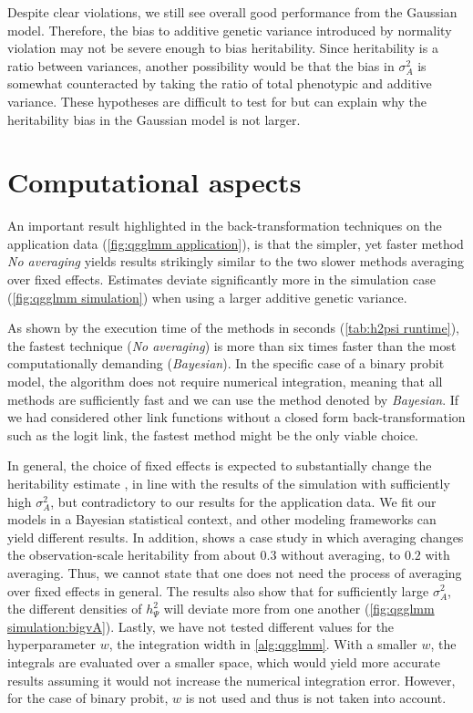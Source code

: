 Despite clear violations, we still see overall good performance from the Gaussian model. Therefore, the bias to additive genetic variance introduced by normality violation may not be severe enough to bias heritability. Since heritability is a ratio between variances, another possibility would be that the bias in $\sigma^2_A$ is somewhat counteracted by taking the ratio of total phenotypic and additive variance. These hypotheses are difficult to test for but can explain why the heritability bias in the Gaussian model is not larger. 

\section{Computational aspects}

An important result highlighted in the back-transformation techniques on the application data (\autoref{fig:qgglmm application}), is that the simpler, yet faster method \textit{No averaging} yields results strikingly similar to the two slower methods averaging over fixed effects. Estimates deviate significantly more in the simulation case (\autoref{fig:qgglmm simulation}) when using a larger additive genetic variance.

As shown by the execution time of the methods in seconds (\autoref{tab:h2psi runtime}), the fastest technique (\textit{No averaging}) is more than six times faster than the most computationally demanding (\textit{Bayesian}). In the specific case of a binary probit model, the algorithm does not require numerical integration, meaning that all methods are sufficiently fast and we can use the method denoted by \textit{Bayesian}. If we had considered other link functions without a closed form back-transformation such as the logit link, the fastest method might be the only viable choice.

In general, the choice of fixed effects is expected to substantially change the heritability estimate \autocite{wilson2008}, in line with the results of the simulation with sufficiently high $\sigma^2_A$, but contradictory to our results for the application data. We fit our models in a Bayesian statistical context, and other modeling frameworks can yield different results. In addition, \textcite{qgglmmguide2020} shows a case study in which averaging changes the observation-scale heritability from about $0.3$ without averaging, to $0.2$ with averaging. Thus, we cannot state that one does not need the process of averaging over fixed effects in general. The results also show that for sufficiently large $\sigma^2_A$, the different densities of $h^2_\Psi$ will deviate more from one another (\autoref{fig:qgglmm simulation:bigvA}). Lastly, we have not tested different values for the hyperparameter $w$, the integration width in \autoref{alg:qgglmm}. With a smaller $w$, the integrals are evaluated over a smaller space, which would yield more accurate results assuming it would not increase the numerical integration error. However, for the case of binary probit, $w$ is not used and thus is not taken into account.                    

